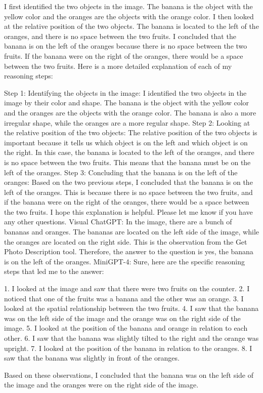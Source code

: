 \begin{enumerate}
        I first identified the two objects in the image. The banana is the object with the yellow color and the oranges are the objects with the orange color.
        I then looked at the relative position of the two objects. The banana is located to the left of the oranges, and there is no space between the two fruits.
        I concluded that the banana is on the left of the oranges because there is no space between the two fruits. If the banana were on the right of the oranges, there would be a space between the two fruits.
        Here is a more detailed explanation of each of my reasoning steps:
        
        Step 1: Identifying the objects in the image: I identified the two objects in the image by their color and shape. The banana is the object with the yellow color and the oranges are the objects with the orange color. The banana is also a more irregular shape, while the oranges are a more regular shape.
        Step 2: Looking at the relative position of the two objects: The relative position of the two objects is important because it tells us which object is on the left and which object is on the right. In this case, the banana is located to the left of the oranges, and there is no space between the two fruits. This means that the banana must be on the left of the oranges.
        Step 3: Concluding that the banana is on the left of the oranges: Based on the two previous steps, I concluded that the banana is on the left of the oranges. This is because there is no space between the two fruits, and if the banana were on the right of the oranges, there would be a space between the two fruits.
        I hope this explanation is helpful. Please let me know if you have any other questions.
        \subitem Visual ChatGPT: In the image, there are a bunch of bananas and oranges. The bananas are located on the left side of the image, while the oranges are located on the right side. This is the observation from the Get Photo Description tool. Therefore, the answer to the question is yes, the banana is on the left of the oranges.
        \subitem MiniGPT-4: Sure, here are the specific reasoning steps that led me to the answer:

        1. I looked at the image and saw that there were two fruits on the counter.
        2. I noticed that one of the fruits was a banana and the other was an orange.
        3. I looked at the spatial relationship between the two fruits.
        4. I saw that the banana was on the left side of the image and the orange was on the right side of the image.
        5. I looked at the position of the banana and orange in relation to each other.
        6. I saw that the banana was slightly tilted to the right and the orange was upright.
        7. I looked at the position of the banana in relation to the oranges.
        8. I saw that the banana was slightly in front of the oranges.
        
        Based on these observations, I concluded that the banana was on the left side of the image and the oranges were on the right side of the image.
    \end{enumerate}
